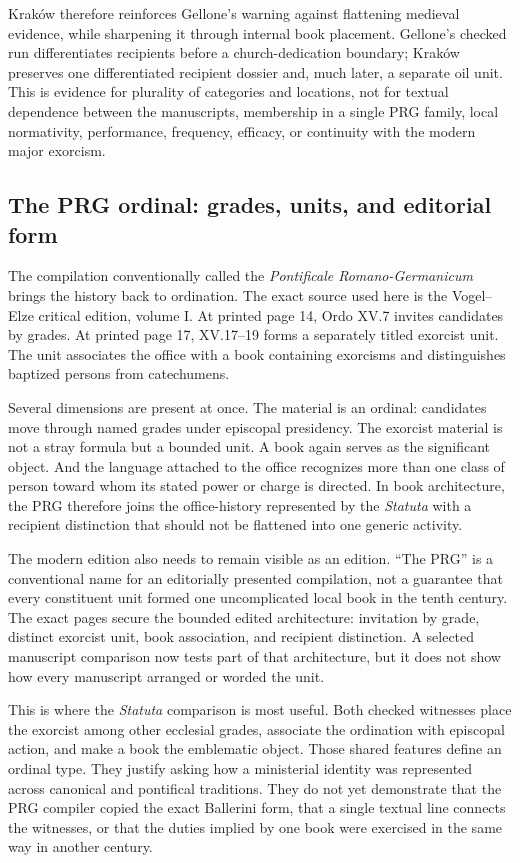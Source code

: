 Kraków therefore reinforces Gellone's warning against flattening medieval
evidence, while sharpening it through internal book placement. Gellone's
checked run differentiates recipients before a church-dedication boundary;
Kraków preserves one differentiated recipient dossier and, much later, a
separate oil unit. This is evidence for plurality of categories and locations,
not for textual dependence between the manuscripts, membership in a single
PRG family, local normativity, performance, frequency, efficacy, or continuity
with the modern major exorcism.

\subsection{The PRG ordinal: grades, units, and editorial form}

The compilation conventionally called the
\emph{Pontificale Romano-Germanicum} brings the history back to ordination.
The exact source used here is the Vogel--Elze critical edition, volume I. At
printed page 14, Ordo XV.7 invites candidates by grades. At printed page 17,
XV.17--19 forms a separately titled exorcist unit. The unit associates the
office with a book containing exorcisms and distinguishes baptized persons
from catechumens.

Several dimensions are present at once. The material is an ordinal: candidates
move through named grades under episcopal presidency. The exorcist material is
not a stray formula but a bounded unit. A book again serves as the significant
object. And the language attached to the office recognizes more than one
class of person toward whom its stated power or charge is directed. In book
architecture, the PRG therefore joins the office-history represented by the
\emph{Statuta} with a recipient distinction that should not be flattened into
one generic activity.

The modern edition also needs to remain visible as an edition. ``The PRG'' is
a conventional name for an editorially presented compilation, not a guarantee
that every constituent unit formed one uncomplicated local book in the tenth
century. The exact pages secure the bounded edited architecture: invitation by
grade, distinct exorcist unit, book association, and recipient distinction.
A selected manuscript comparison now tests part of that architecture, but it
does not show how every manuscript arranged or worded the unit.

This is where the \emph{Statuta} comparison is most useful. Both checked
witnesses place the exorcist among other ecclesial grades, associate the
ordination with episcopal action, and make a book the emblematic object.
Those shared features define an ordinal type. They justify asking how a
ministerial identity was represented across canonical and pontifical
traditions. They do not yet demonstrate that the PRG compiler copied the
exact Ballerini form, that a single textual line connects the witnesses, or
that the duties implied by one book were exercised in the same way in another
century.

